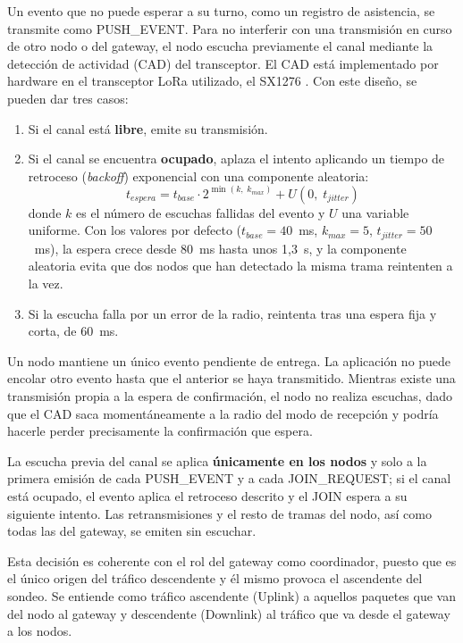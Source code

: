 Un evento que no puede esperar a su turno, como un registro de asistencia, se transmite como PUSH\_EVENT. Para no interferir con una transmisión en curso de otro nodo o del gateway, el nodo escucha previamente el canal mediante la detección de actividad (CAD) del transceptor. El CAD está implementado por hardware en el transceptor LoRa utilizado, el SX1276 \cite{semtech_sx1276}. Con este diseño, se pueden dar tres casos:

\begin{enumerate}
\item Si el canal está \textbf{libre}, emite su transmisión.
\item Si el canal se encuentra \textbf{ocupado}, aplaza el intento aplicando un tiempo de retroceso (\textit{backoff}) exponencial con una componente aleatoria:
\begin{equation}\label{eq:backoff}
t_{espera} = t_{base} \cdot 2^{\min(k,\;k_{max})} + U(0,\;t_{jitter})
\end{equation}
donde $k$ es el número de escuchas fallidas del evento y $U$ una variable uniforme. Con los valores por defecto ($t_{base}=40$~ms, $k_{max}=5$, $t_{jitter}=50$~ms), la espera crece desde 80~ms hasta unos 1,3~s, y la componente aleatoria evita que dos nodos que han detectado la misma trama reintenten a la vez.

\item Si la escucha falla por un error de la radio, reintenta tras una espera fija y corta, de 60~ms.
\end{enumerate}

Un nodo mantiene un único evento pendiente de entrega. La aplicación no puede encolar otro evento hasta que el anterior se haya transmitido. Mientras existe una transmisión propia a la espera de confirmación, el nodo no realiza escuchas, dado que el CAD saca momentáneamente a la radio del modo de recepción y podría hacerle perder precisamente la confirmación que espera.


La escucha previa del canal se aplica \textbf{únicamente en los nodos} y solo a la primera emisión de cada PUSH\_EVENT y a cada JOIN\_REQUEST; si el canal está ocupado, el evento aplica el retroceso descrito y el JOIN espera a su siguiente intento. Las retransmisiones y el resto de tramas del nodo, así como todas las del gateway, se emiten sin escuchar.

Esta decisión es coherente con el rol del gateway como coordinador, puesto que es el único origen del tráfico descendente y él mismo provoca el ascendente del sondeo. Se entiende como tráfico ascendente (Uplink) a aquellos paquetes que van del nodo al gateway y descendente (Downlink) al tráfico que va desde el gateway a los nodos.


